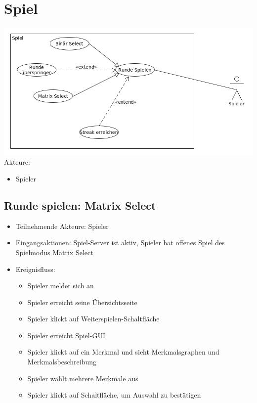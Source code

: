 \documentclass[a4paper]{scrreprt}
\begin{document}
    \newpage
    \section{Spiel}
    \includegraphics[width=\textwidth]{uml/export/Spiel.png}
    Akteure: 
    \begin{itemize}
    \item \Gls{Spieler}
    \end{itemize}
    
   
    \subsection{Runde spielen: Matrix Select}
    \begin{itemize}
    	\item Teilnehmende Akteure: \Gls{Spieler}
    	\item Eingangsaktionen: \Gls{Spiel-Server} ist aktiv, Spieler hat offenes \Gls{Spiel} des \Gls{Spielmodus} Matrix Select
    	\item Ereignisfluss:
    	\begin{itemize}
    		\item \Gls{Spieler} meldet sich an
    		\item \Gls{Spieler} erreicht seine Übersichtsseite
    		\item \Gls{Spieler} klickt auf Weiterspielen-Schaltfläche
    		\item \Gls{Spieler} erreicht Spiel-GUI
    		\item \Gls{Spieler} klickt auf ein Merkmal und sieht Merkmalsgraphen und Merkmalsbeschreibung
    		\item \Gls{Spieler} wählt mehrere Merkmale aus
    		\item \Gls{Spieler} klickt auf Schaltfläche, um Auswahl zu bestätigen
    	\end{itemize}
    \end{itemize}
	
\end{document}
